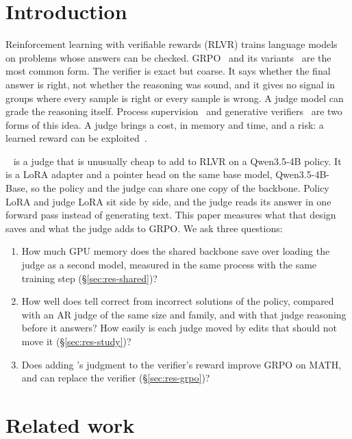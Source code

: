 
\section{Introduction}\label{sec:intro}

Reinforcement learning with verifiable rewards (RLVR) trains language models on problems whose answers can be checked.
GRPO~\cite{shao2024deepseekmath,deepseek2025r1} and its variants~\cite{liu2025understanding,liu2026tricks} are the most
common form. The verifier is exact but coarse. It says whether the final answer is right, not whether the reasoning was
sound, and it gives no signal in groups where every sample is right or every sample is wrong. A judge model can grade
the reasoning itself. Process supervision~\cite{lightman2024verify,wang2024mathshepherd} and generative
verifiers~\cite{zhang2024genverifier} are two forms of this idea. A judge brings a cost, in memory and time, and a risk:
a learned reward can be exploited~\cite{gao2023scaling,skalse2022defining}.

\kev{}~\cite{kev4b} is a judge that is unusually cheap to add to RLVR on a Qwen3.5-4B policy. It is a LoRA adapter and
a pointer head on the same base model, Qwen3.5-4B-Base, so the policy and the judge can share one copy of the backbone.
Policy LoRA and judge LoRA sit side by side, and the judge reads its answer in one forward pass instead of generating
text. This paper measures what that design saves and what the judge adds to GRPO. We ask three questions:
\begin{enumerate}
\item How much GPU memory does the shared backbone save over loading the judge as a second model, measured in the
  same process with the same training step (\S\ref{sec:res-shared})?
\item How well does \kev{} tell correct from incorrect solutions of the policy, compared with an AR judge of the
  same size and family, and with that judge reasoning before it answers? How easily is each judge moved by edits that
  should not move it (\S\ref{sec:res-study})?
\item Does adding \kev{}'s judgment to the verifier's reward improve GRPO on MATH, and can \kev{} replace the
  verifier (\S\ref{sec:res-grpo})?
\end{enumerate}

\section{Related work}\label{sec:related}

